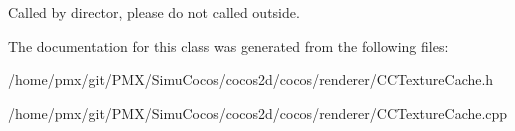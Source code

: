 Called by director, please do not called outside. 

The documentation for this class was generated from the following files\+:\begin{DoxyCompactItemize}
\item 
/home/pmx/git/\+P\+M\+X/\+Simu\+Cocos/cocos2d/cocos/renderer/C\+C\+Texture\+Cache.\+h\item 
/home/pmx/git/\+P\+M\+X/\+Simu\+Cocos/cocos2d/cocos/renderer/C\+C\+Texture\+Cache.\+cpp\end{DoxyCompactItemize}
